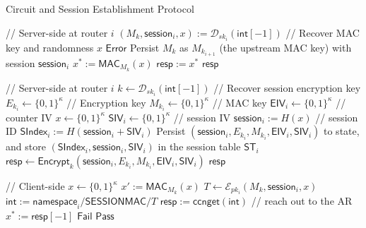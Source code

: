 \begin{algorithm}[ht!]
  \caption{Circuit and Session Establishment Protocol}
  \begin{algorithmic}[1]

 // Server-side at router $i$
  \State $(M_{k}, \mathsf{session}_i, x) := \mathcal{D}_{sk_i}(\mathsf{int}[-1])$ // Recover MAC key and randomness $x$
    \State \Return $\mathsf{Error}$
  \Else
    \State Persist $M_k$ as $M_{k_{i+1}}$ (the upstream MAC key) with session $\mathsf{session}_i$
    \State $x^* := \mathsf{MAC}_{M_{k}}(x)$
    \State $\mathsf{resp} := x^*$
    \State \Return $\mathsf{resp}$
  \EndIf

\EndFunction

 // Server-side at router $i$
  \State $k \gets \mathcal{D}_{sk_i}(\mathsf{int}[-1])$ // Recover session encryption key
  \State $E_{k_i} \gets \{0,1\}^{\kappa}$ // Encryption key
  \State $M_{k_i} \gets \{0,1\}^{\kappa}$ // MAC key
  \State $\mathsf{EIV}_i \gets \{0,1\}^{\kappa}$     // counter IV
  \State $x \gets \{0,1\}^{\kappa}$
  \State $\mathsf{SIV}_i \gets \{0,1\}^{\kappa}$ // session IV
  \State $\mathsf{session}_i := H(x)$ // session ID
  \State $\mathsf{SIndex}_i := H(\mathsf{session}_i + \mathsf{SIV}_i)$
  \State Persist $(\mathsf{session}_i, E_{k_i}, M_{k_i}, \mathsf{EIV}_i, \mathsf{SIV}_i)$ to state, and store $(\mathsf{SIndex}_i, \mathsf{session}_i, \mathsf{SIV}_i)$ in the session table $\mathsf{ST}_i$
  \State $\mathsf{resp} \gets \mathsf{Encrypt}_{k}(\mathsf{session}_i, E_{k_i}, M_{k_i}, \mathsf{EIV}_i, \mathsf{SIV}_i)$
  \State \Return $\mathsf{resp}$
  
\EndFunction

 // Client-side
  \State $x \gets \{0,1\}^{\kappa}$
  \State $x' := \mathsf{MAC}_{M_{k}}(x)$
  \State $T \gets \mathcal{E}_{pk_i}(M_{k}, \mathsf{session}_i, x)$
  \State $\mathsf{int} := \mathsf{namespace}_i/\mathsf{SESSIONMAC}/T$
  \State $\mathsf{resp} := \mathsf{ccnget}(\mathsf{int})$ // reach out to the AR
  \State $x^* := \mathsf{resp}[-1]$
    \State \Return $\mathsf{Fail}$
  \Else
    \State \Return $\mathsf{Pass}$
  \EndIf


\end{algorithmic}
\end{algorithm}
